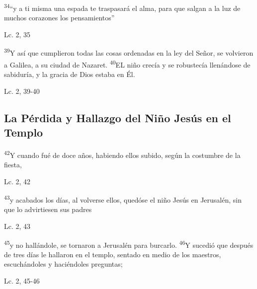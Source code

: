 \documentclass[a4paper,11pt,sans]{article}
\begin{document}
      \begin{center}
        \textsuperscript{34}``y a ti misma una espada te traspasará el alma, para que salgan a la luz de muchos corazones los pensamientos''
      \end{center}
      \begin{center}
        Lc. 2, 35         
      \end{center}      
      
      \begin{center}
        \textsuperscript{39}Y así que cumplieron todas las cosas ordenadas en la ley del Señor, se volvieron a Galilea, a su ciudad de Nazaret. \textsuperscript{40}EL niño crecía
        y se robustecía llenándose de sabiduría, y la gracia de Dios estaba en Él.
      \end{center}
      \begin{center}
        Lc. 2, 39-40         
      \end{center}
            
    \subsection*{\hfil La Pérdida y Hallazgo del Niño Jesús en el Templo \hfil}
      
      \begin{center}
        \textsuperscript{42}Y cuando fué de doce años, habiendo ellos subido, según la costumbre de la fiesta,
      \end{center}
      \begin{center}
        Lc. 2, 42     
      \end{center}
      
      \begin{center}
        \textsuperscript{43}y acabados los días, al volverse ellos, quedóse el niño Jesús en Jerusalén, sin que lo advirtiesen sus padres
      \end{center}
      \begin{center}
        Lc. 2, 43        
      \end{center}
      
      \begin{center}
        \textsuperscript{45}y no hallándole, se tornaron a Jerusalén para burcarlo. \textsuperscript{46}Y sucedió que después de tres días le hallaron en el templo,
        sentado en medio de los maestros, escuchándoles y haciéndoles preguntas;
      \end{center}
      \begin{center}
        Lc. 2, 45-46       
      \end{center}
      
\end{document}
